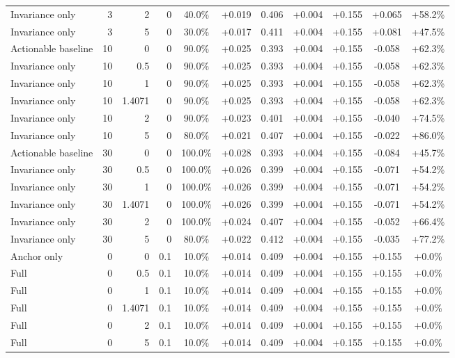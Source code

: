\begin{table}[htbp]
\begin{tabular}{lrrrccccccc}
Invariance only & 3 & 2 & 0 & 40.0\% & +0.019 & 0.406 & +0.004 & +0.155 & +0.065 & +58.2\% \\
Invariance only & 3 & 5 & 0 & 30.0\% & +0.017 & 0.411 & +0.004 & +0.155 & +0.081 & +47.5\% \\
Actionable baseline & 10 & 0 & 0 & 90.0\% & +0.025 & 0.393 & +0.004 & +0.155 & -0.058 & +62.3\% \\
Invariance only & 10 & 0.5 & 0 & 90.0\% & +0.025 & 0.393 & +0.004 & +0.155 & -0.058 & +62.3\% \\
Invariance only & 10 & 1 & 0 & 90.0\% & +0.025 & 0.393 & +0.004 & +0.155 & -0.058 & +62.3\% \\
Invariance only & 10 & 1.4071 & 0 & 90.0\% & +0.025 & 0.393 & +0.004 & +0.155 & -0.058 & +62.3\% \\
Invariance only & 10 & 2 & 0 & 90.0\% & +0.023 & 0.401 & +0.004 & +0.155 & -0.040 & +74.5\% \\
Invariance only & 10 & 5 & 0 & 80.0\% & +0.021 & 0.407 & +0.004 & +0.155 & -0.022 & +86.0\% \\
Actionable baseline & 30 & 0 & 0 & 100.0\% & +0.028 & 0.393 & +0.004 & +0.155 & -0.084 & +45.7\% \\
Invariance only & 30 & 0.5 & 0 & 100.0\% & +0.026 & 0.399 & +0.004 & +0.155 & -0.071 & +54.2\% \\
Invariance only & 30 & 1 & 0 & 100.0\% & +0.026 & 0.399 & +0.004 & +0.155 & -0.071 & +54.2\% \\
Invariance only & 30 & 1.4071 & 0 & 100.0\% & +0.026 & 0.399 & +0.004 & +0.155 & -0.071 & +54.2\% \\
Invariance only & 30 & 2 & 0 & 100.0\% & +0.024 & 0.407 & +0.004 & +0.155 & -0.052 & +66.4\% \\
Invariance only & 30 & 5 & 0 & 80.0\% & +0.022 & 0.412 & +0.004 & +0.155 & -0.035 & +77.2\% \\
Anchor only & 0 & 0 & 0.1 & 10.0\% & +0.014 & 0.409 & +0.004 & +0.155 & +0.155 & +0.0\% \\
Full & 0 & 0.5 & 0.1 & 10.0\% & +0.014 & 0.409 & +0.004 & +0.155 & +0.155 & +0.0\% \\
Full & 0 & 1 & 0.1 & 10.0\% & +0.014 & 0.409 & +0.004 & +0.155 & +0.155 & +0.0\% \\
Full & 0 & 1.4071 & 0.1 & 10.0\% & +0.014 & 0.409 & +0.004 & +0.155 & +0.155 & +0.0\% \\
Full & 0 & 2 & 0.1 & 10.0\% & +0.014 & 0.409 & +0.004 & +0.155 & +0.155 & +0.0\% \\
Full & 0 & 5 & 0.1 & 10.0\% & +0.014 & 0.409 & +0.004 & +0.155 & +0.155 & +0.0\% \\

\end{tabular}
\end{table}
